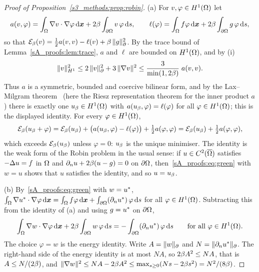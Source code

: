 \begin{proof}[Proof of Proposition~\ref{s3_methods:prop:robin}]
(a) For $v,\varphi\in H^1(\Omega)$ let
\[
a(v,\varphi)=\int_\Omega\nabla v\cdot\nabla\varphi\,\mathrm{d}\boldsymbol{x}+2\beta\int_{\partial\Omega}v\,\varphi\,\mathrm{d} s,
\qquad
\ell(\varphi)=\int_\Omega f\varphi\,\mathrm{d}\boldsymbol{x}+2\beta\int_{\partial\Omega}g\,\varphi\,\mathrm{d} s ,
\]
so that $\mathcal{E}_{\beta}(v)=\tfrac12a(v,v)-\ell(v)+\beta\,\lVert g\rVert_{\partial}^2$. By the trace bound
of Lemma~\ref{sA_proofs:lem:trace}, $a$ and $\ell$ are bounded on $H^1(\Omega)$, and by (i)
\[
\lVert v\rVert_{H^1}^2\le2\,\lVert v\rVert_{\partial}^2+3\,\lVert \nabla v\rVert^2
\le\frac{3}{\min(1,2\beta)}\;a(v,v) .
\]
Thus $a$ is a symmetric, bounded and coercive bilinear form, and by the Lax--Milgram
theorem~\citep[Sec.~6.2.1]{evans2010} (here the Riesz representation theorem for the inner
product $a$) there is exactly one $u_{\beta}\in H^1(\Omega)$ with
$a(u_{\beta},\varphi)=\ell(\varphi)$ for all $\varphi\in H^1(\Omega)$; this is the displayed
identity. For every $\varphi\in H^1(\Omega)$,
\[
\mathcal{E}_{\beta}(u_{\beta}+\varphi)=\mathcal{E}_{\beta}(u_{\beta})+\bigl(a(u_{\beta},\varphi)-\ell(\varphi)\bigr)+\tfrac12a(\varphi,\varphi)
=\mathcal{E}_{\beta}(u_{\beta})+\tfrac12a(\varphi,\varphi),
\]
which exceeds $\mathcal{E}_{\beta}(u_{\beta})$ unless $\varphi=0$: $u_{\beta}$ is the unique minimiser. The
identity is the weak form of the Robin problem in the usual sense: if
$u\in C^2(\overline{\Omega})$ satisfies $-\Delta u=f$ in $\Omega$ and $\partial_n u+2\beta(u-g)=0$ on $\partial\Omega$,
then~\eqref{sA_proofs:eq:green} with $w=u$ shows that $u$ satisfies the identity, and so
$u=u_{\beta}$.

(b) By~\eqref{sA_proofs:eq:green} with $w=u^{*}$,
$\int_\Omega\nabla u^{*}\cdot\nabla\varphi\,\mathrm{d}\boldsymbol{x}=\int_\Omega f\varphi\,\mathrm{d}\boldsymbol{x}+\int_{\partial\Omega}(\partial_nu^{*})\,\varphi\,\mathrm{d} s$
for all $\varphi\in H^1(\Omega)$. Subtracting this from the identity of (a) and using
$g=u^{*}$ on $\partial\Omega$,
\begin{equation}\label{sA_proofs:eq:werr}
\int_\Omega\nabla w\cdot\nabla\varphi\,\mathrm{d}\boldsymbol{x}+2\beta\int_{\partial\Omega}w\,\varphi\,\mathrm{d} s
=-\int_{\partial\Omega}(\partial_nu^{*})\,\varphi\,\mathrm{d} s\qquad\text{for all }\varphi\in H^1(\Omega).
\end{equation}
The choice $\varphi=w$ is the energy identity. Write $A=\lVert w\rVert_{\partial}$ and
$N=\lVert \partial_nu^{*}\rVert_{\partial}$. The right-hand side of the energy identity is at most $NA$,
so $2\beta A^2\le NA$, that is $A\le N/(2\beta)$, and
$\lVert \nabla w\rVert^2\le NA-2\beta A^2\le\max_{s\ge0}(Ns-2\beta s^2)=N^2/(8\beta)$.


\end{proof}
